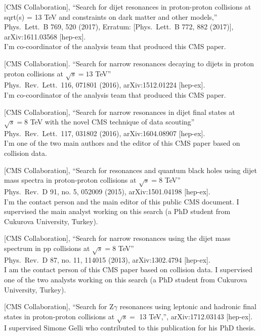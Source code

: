 \documentclass[10pt, a4paper]{article}
\begin{document}
\begin{thebibliography}{599}
  [CMS Collaboration],
  ``Search for dijet resonances in proton-proton collisions at sqrt(s) = 13 TeV and constraints on dark matter and other models,''\\
  Phys.\ Lett.\ B 769, 520 (2017), Erratum: [Phys.\ Lett.\ B 772, 882 (2017)], arXiv:1611.03568 [hep-ex].\\
  I'm co-coordinator of the analysis team that produced this CMS paper.
 
  [CMS Collaboration].
  ``Search for narrow resonances decaying to  dijets in proton
    proton collisions at $\sqrt{s}=13$ TeV''\\
  Phys.\ Rev.\ Lett.\  116, 071801 (2016), arXiv:1512.01224 [hep-ex].\\
I'm co-coordinator of the analysis team that produced this CMS paper.

[CMS Collaboration],
  ``Search for narrow resonances in dijet final states at $\sqrt{s}=8$
  TeV with the novel CMS technique of data scouting''\\
  Phys.\ Rev.\ Lett.\  117, 031802 (2016), arXiv:1604.08907 [hep-ex].
\\I'm one of the two main authors and the editor of this CMS paper based on
collision data.

  [CMS Collaboration],
  ``Search for resonances and quantum black holes using dijet mass
  spectra in proton-proton collisions at $\sqrt{s}=8$ TeV''\\
  Phys.\ Rev.\ D 91, no. 5, 052009 (2015), arXiv:1501.04198 [hep-ex].
  \\I'm the contact person and the main editor of this public CMS document. I supervised the main analyst working on this search (a PhD student from Cukurova University, Turkey).

[CMS Collaboration],
 ``Search for narrow resonances using the dijet mass spectrum in pp collisions at $\sqrt{s}=8$ TeV''\\
Phys.\ Rev.\ D 87, no. 11, 114015 (2013), arXiv:1302.4794 [hep-ex].
 \\ I am the contact person of this CMS paper based on collision data. I supervised one of the two analysts working on this search (a PhD student from Cukurova University, Turkey).  

[CMS Collaboration],
 ``Search for Z$\gamma$ resonances using leptonic and hadronic final
 states in proton-proton collisions at $\sqrt{s}=$ 13 TeV,'',
 arXiv:1712.03143 [hep-ex].
 \\ I supervised Simone Gelli who contributed to this publication for his PhD thesis.  


\end{thebibliography}
\end{document}
